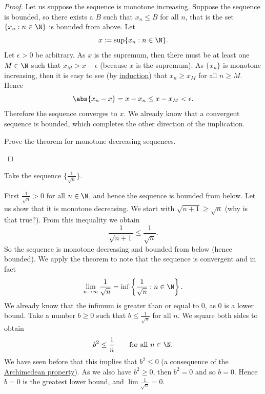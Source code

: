 \documentclass[12pt]{book}
\begin{document}
\begin{proof}
Let us suppose the sequence is monotone increasing.
Suppose 
the sequence is bounded, so there exists a $B$
such that $x_n \leq B$ for all $n$, that is the set
$\{ x_n : n \in  \N \}$ is bounded from above.
Let
\begin{equation*}
x := \sup \{ x_n : n \in \N \} .
\end{equation*}
Let $\epsilon > 0$ be arbitrary.
As $x$ is the supremum, then
there must be at least one $M \in \N$ such that $x_{M} > x-\epsilon$
(because $x$ is the supremum).
As $\{ x_n \}$ is monotone increasing,
then it is easy to see (by \hyperref[induction:thm]{induction}) that
$x_n \geq x_{M}$ for all $n \geq M$.
Hence
\begin{equation*}
\abs{x_n-x} = x-x_n \leq x-x_{M} < \epsilon  .
\end{equation*}
Therefore the sequence converges to $x$.
We already know that a convergent sequence is bounded, which completes the
other direction of the implication.

\begin{exercise}
Prove the theorem for monotone decreasing sequences.
\end{exercise}
\end{proof}


\begin{example}
Take the sequence $\{ \frac{1}{\sqrt{n}} \}$.

First $\frac{1}{\sqrt{n}} > 0$ for all $n \in \N$, and hence the sequence is
bounded from below.
Let us show that it is monotone decreasing.
We start with
$\sqrt{n+1} \geq \sqrt{n}$ (why is that true?).
From this inequality
we obtain
\begin{equation*}
\frac{1}{\sqrt{n+1}} \leq \frac{1}{\sqrt{n}} .
\end{equation*}
So the sequence is monotone decreasing and bounded from below (hence
bounded).
We apply the theorem to note that the sequence is
convergent and in fact
\begin{equation*}
\lim_{n\to \infty} \frac{1}{\sqrt{n}}
=
\inf \left\{ \frac{1}{\sqrt{n}} : n \in \N \right\} .
\end{equation*}
We already know that the infimum is greater than or equal to 0, as
0 is a lower bound.
Take a number $b \geq 0$ such
that $b \leq \frac{1}{\sqrt{n}}$ for all $n$.
We square both sides to
obtain
\begin{equation*}
b^2 \leq \frac{1}{n} \qquad \text{for all $n \in \N$}.
\end{equation*}
We have seen before that this implies that $b^2 \leq 0$ (a consequence
of the \hyperref[thm:arch:i]{Archimedean property}).
As we also have $b^2 \geq 0$, then $b^2 = 0$
and so $b = 0$.
Hence $b=0$ is the greatest lower bound, and $\lim \frac{1}{\sqrt{n}} = 0$.
\end{example}
\end{document}
